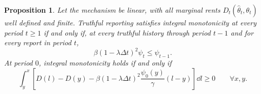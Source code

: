 \documentclass[12pt]{article}
\newtheorem{prop}{Proposition}
\newcommand{\hth}{\hat\theta}
\begin{document}
\begin{prop}\label{prop:linear-imc-early}
Let the mechanism be linear, with all marginal rents
\(D_t(\hth_t,\theta_t)\) well defined and finite.
Truthful reporting satisfies integral
monotonicity at every period \(t\geq1\) if and only if, at every
truthful history through period \(t-1\) and for every report in
period \(t\),
\begin{equation}\label{eq: discrete bound}
  \beta(1-\lambda\Delta t)^2\psi_t
  \leq
  \psi_{t-1}.
\end{equation}
At period \(0\), integral monotonicity holds if and only if
\begin{equation}\label{eq:discrete date zero}
  \int_y^x
  \left[
    D(l)-D(y)
    -\beta(1-\lambda\Delta t)^2
      \frac{\psi_0(y)}{\gamma}(l-y)
  \right]\dd l
  \geq0
  \qquad \forall x,y.
\end{equation}
\end{prop}
\end{document}
